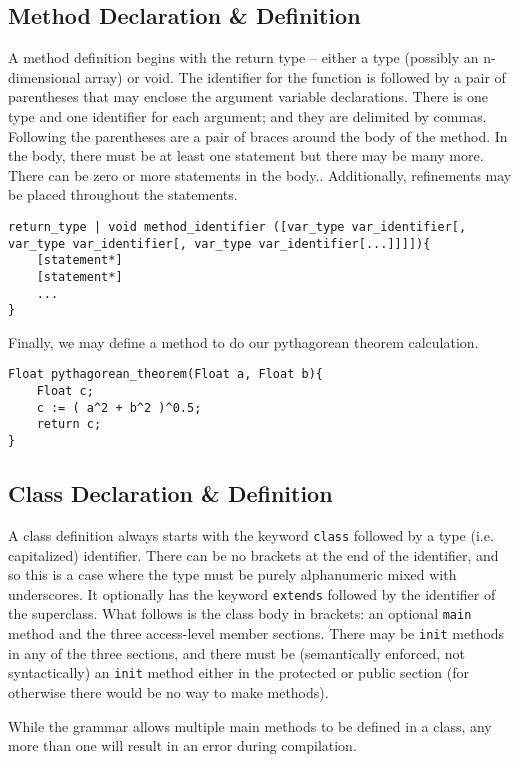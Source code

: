 \subsection{Method Declaration \& Definition}
A method definition begins with the return type -- either a type (possibly an n-dimensional array) or void. The identifier for the function is followed by a pair of parentheses that may enclose the argument variable declarations. There is one type and one identifier for each argument; and they are delimited by commas. Following the parentheses are a pair of braces around the body of the method. In the body, there must be at least one statement but there may be many more. There can be zero or more statements in the body.. Additionally, refinements may be placed throughout the statements.
 
\begin{lstlisting}
return_type | void method_identifier ([var_type var_identifier[, var_type var_identifier[, var_type var_identifier[...]]]]){
    [statement*]
    [statement*]
    ...
}
\end{lstlisting}

Finally, we may define a method to do our pythagorean theorem calculation.

\begin{lstlisting}[label=Method Invocation,caption=Method Definition for the Pythagorean Theorem]
Float pythagorean_theorem(Float a, Float b){
    Float c;
    c := ( a^2 + b^2 )^0.5;
    return c;
}
\end{lstlisting}

\subsection{Class Declaration \& Definition}
A class definition always starts with the keyword \verb!class! followed by a type (i.e. capitalized) identifier. There can be no brackets at the end of the identifier, and so this is a case where the type must be purely alphanumeric mixed with underscores. It optionally has the keyword \verb!extends! followed by the identifier of the superclass. What follows is the class body in brackets: an optional \verb!main! method and the three access-level member sections. There may be \verb!init! methods in any of the three sections, and there must be (semantically enforced, not syntactically) an \verb!init! method either in the protected or public section (for otherwise there would be no way to make methods).

While the grammar allows multiple main methods to be defined in a class, any more than one will result in an error during compilation.

